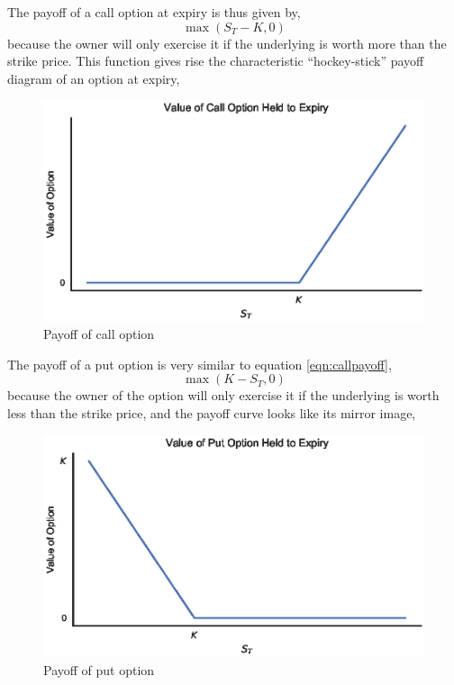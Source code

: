 \documentclass[11pt]{article}
\numberwithin{equation}{section}
\begin{document}
The payoff of a call option at expiry is thus given by,
\begin{equation}
 \max(S_T - K, 0) 
\label{eqn:callpayoff}
\end{equation}
because the owner will only exercise it if the underlying is worth more than the
strike price. This function gives rise the characteristic ``hockey-stick''
payoff diagram of an option at expiry,

\begin{figure}[h]
\centering
\includegraphics{figs/calloptpayoff}
\caption{Payoff of call option}
\label{fig:calloptpayoff}
\end{figure}


The payoff of a put option is very similar to equation \ref{eqn:callpayoff},
\begin{equation}
 \max(K-S_T, 0) 
\end{equation}
because the owner of the option will only exercise it if the underlying is worth
less than the strike price, 
and the payoff curve looks like its mirror image,

\begin{figure}[h]
\centering
\includegraphics{figs/putoptpayoff}
\caption{Payoff of put option}
\label{fig:putoptpayoff}
\end{figure}
\end{document}
